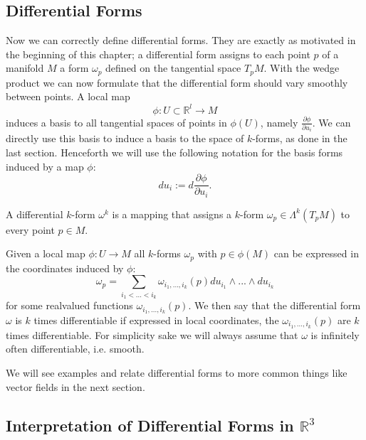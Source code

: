 \subsection{Differential Forms}
\label{subsec:defDiffform}
Now we can correctly define differential forms. They are exactly as motivated in the beginning of this chapter; a differential form assigns to each point $p$ of a manifold $M$ a form $\omega_p$ defined on the tangential space $T_pM$. With the wedge product we can now formulate that the differential form should vary smoothly between points. A local map 
\[\phi:  U \subset\mathbb R^l \to M\] 
induces a basis to all tangential spaces of points in $\phi(U)$, namely $\frac{\partial \phi}{\partial u_i}$. We can directly use this basis to induce a basis to the space of $k$-forms, as done in the last section. Henceforth we will use the following notation for the basis forms induced by a map $\phi$:
\[d u_i:= d\frac{\partial \phi}{\partial u_i}.\]

\begin{definition}
A differential $k$-form $\omega^k$ is a mapping that assigns a $k$-form $\omega_p \in \Lambda^k(T_pM)$ to every point $p\in M$.

Given a local map $\phi: U \rightarrow M$ all $k$-forms $\omega_p$ with $p\in \phi(M)$ can be expressed in the  coordinates induced by $\phi$:
\[\omega_p = \sum_{i_1<...<i_k}\omega_{i_1,...,i_k}(p) du_{i_1}\wedge...\wedge du_{i_k}\]
for some realvalued functions $\omega_{i_1,...,i_k}(p)$. We then say that the differential form $\omega$ is $k$ times differentiable if expressed in local coordinates, the $\omega_{i_1,...,i_k}(p)$ are $k$ times differentiable. For simplicity sake we will always assume that $\omega$ is infinitely often differentiable, i.e. smooth.

\end{definition}

We will see examples and relate differential forms to more common things like vector fields in the next section. 


\subsection{Interpretation of Differential Forms in $\mathbb{R}^3$}


